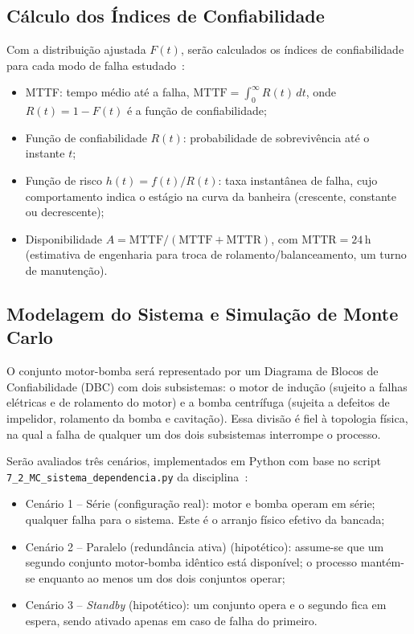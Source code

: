 \documentclass[conference]{IEEEtran}
\begin{document}
\subsection{Cálculo dos Índices de Confiabilidade}

Com a distribuição ajustada $F(t)$, serão calculados os índices de
confiabilidade para cada modo de falha estudado~\cite{bessani2026,oconnor2012}:

\begin{itemize}
    \item MTTF: tempo médio até a falha,
    $\text{MTTF} = \int_0^\infty R(t)\,dt$, onde
    $R(t) = 1 - F(t)$ é a função de confiabilidade;
    \item Função de confiabilidade $R(t)$: probabilidade de
    sobrevivência até o instante $t$;
    \item Função de risco $h(t) = f(t)/R(t)$: taxa
    instantânea de falha, cujo comportamento indica o estágio na
    curva da banheira (crescente, constante ou decrescente);
    \item Disponibilidade $A = \text{MTTF}/(\text{MTTF} +
    \text{MTTR})$, com $\text{MTTR}=24$\,h (estimativa de engenharia
    para troca de rolamento/balanceamento, um turno de manutenção).
\end{itemize}

\subsection{Modelagem do Sistema e Simulação de Monte Carlo}

O conjunto motor-bomba será representado por um Diagrama de Blocos de
Confiabilidade (DBC) com dois subsistemas: o motor de indução
(sujeito a falhas elétricas e de rolamento do motor) e a
bomba centrífuga (sujeita a defeitos de impelidor, rolamento
da bomba e cavitação). Essa divisão é fiel à topologia física, na qual
a falha de qualquer um dos dois subsistemas interrompe o processo.

Serão avaliados três cenários, implementados em Python com base no
script \texttt{7\_2\_MC\_sistema\_dependencia.py} da
disciplina~\cite{bessani2026}:

\begin{itemize}
    \item Cenário 1 -- Série (configuração real): motor e
    bomba operam em série; qualquer falha para o sistema. Este é o
    arranjo físico efetivo da bancada;
    \item Cenário 2 -- Paralelo (redundância ativa)
    (hipotético): assume-se que um segundo conjunto motor-bomba
    idêntico está disponível; o processo mantém-se enquanto ao menos
    um dos dois conjuntos operar;
    \item Cenário 3 -- \textit{Standby} (hipotético): um conjunto
    opera e o segundo fica em espera, sendo ativado apenas em caso de
    falha do primeiro.
\end{itemize}
\end{document}
